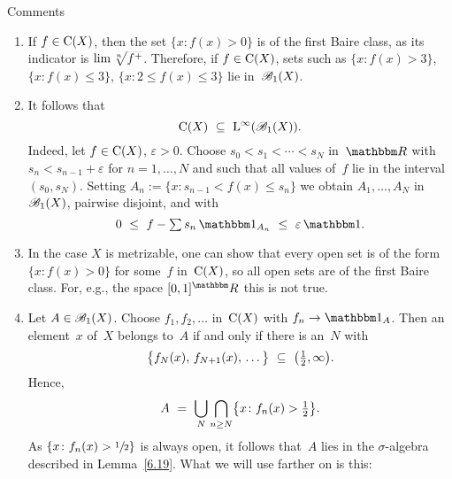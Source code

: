 \documentclass[main.tex]{subfiles}
\begin{document}
%
%
\begin{psec}{7.10}{Comments}
\begin{enumerate}
\item\label{7.10-1}
If $f\in\mathrm{C}(X)$,
then the set $\{x\colon f(x)>0\}$ is of the first Baire class,
as its indicator is $\lim \smash{\sqrt[n]{f^+}}$.
Therefore,
if $f\in\mathrm{C}(X)$,
sets such as $\{x\colon f(x)>3\}$,
$\{x\colon f(x)\leq 3 \}$,
$\{x\colon 2\leq f(x)\leq 3\}$ lie in~$\mathscr{B}_1(X)$.
%
\item\label{7.10-2}
It follows that
\begin{equation*}
\Cont{X}\ \subseteq\ \BNL(\BaireI(X))\htam{.}
\end{equation*}
Indeed,
let $f\in\mathrm{C}(X)$, $\varepsilon>0$.
Choose $s_0<s_1<\dotsb<s_N$ in~$\R$
with $s_n<s_{n-1}+\varepsilon$
for $n=1,\dotsc,N$
and such that all values of~$f$ lie in the interval $(s_0,s_N)$.
Setting $A_n:=\{x\colon s_{n-1}<f(x)\leq s_n\}$
we obtain $A_1,\dotsc, A_N$ in~$\mathscr{B}_1(X)$,
pairwise disjoint, and with
\begin{equation*}
0\ \leq\ f-{\textstyle\sum}\,
 s_n\,\mathbb{1}_{A_n}\ \leq\ \varepsilon\,\mathbb{1}\htam{.}
\end{equation*}
%
\item\label{7.10-3}
In the case $X$ is metrizable,
one can show that every open set is of the form $\{x\colon f(x)>0\}$
for some~$f$ in~$\mathrm{C}(X)$,
so all open sets are of the first Baire class.
For, e.g., the space $[0,1]^\R$ this is not true.
%
\item\label{7.10-4}
Let $A\in\mathscr{B}_1(X)$.
Choose $f_1,f_2,\dotsc$ in~$\mathrm{C}(X)$
with $f_n\ra \mathbb{1}_A$.
Then an element~$x$ of~$X$ belongs to~$A$
if and only if there is an~$N$ with
\begin{equation*}
\bigl\{ f_N(x),\, f_{N+1}(x),\, \dotsc\,\bigr\}
\ \subseteq\ \bigl(\textstyle\frac{1}{2},\infty\bigr)\text{.}
\end{equation*}
Hence,
\begin{equation*}
A\ =\ \bigcup_N \bigcap_{n\geq N} \bigl\{ 
x\colon f_n(x)>\textstyle \frac{1}{2} \bigr\}\text{.}
\end{equation*}
As $\{x\colon f_n(x)>\sfrac{1}{2}\}$ is always open,
it follows that~$A$ lies in the $\sigma$-algebra
described in Lemma~\ref{6.19}.
What we will use farther on is this:
\end{enumerate}
\end{psec}
\end{document}

